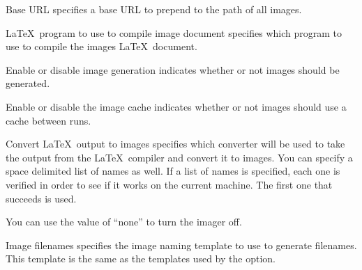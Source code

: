 \begin{configuration}{Base URL}
specifies a base URL to prepend to the path of all images.
\end{configuration}

\begin{configuration}{\LaTeX\ program to use to compile image document}
specifies which program to use to compile the images \LaTeX\ document.
\end{configuration}

\begin{configuration}{Enable or disable image generation}
indicates whether or not images should be generated.
\end{configuration}

\begin{configuration}{Enable or disable the image cache}
indicates whether or not images should use a cache between runs.
\end{configuration}

\begin{configuration}{Convert \LaTeX\ output to images}
specifies which converter will be used to take the output from the
\LaTeX\ compiler and convert it to images.  You can specify a space
delimited list of names as well.  If a list of names is specified,
each one is verified in order to see if it works on the current machine.
The first one that succeeds is used.

You can use the value of ``none'' to turn the imager off.
\end{configuration}

\begin{configuration}{Image filenames}
specifies the image naming template to use to generate filenames.  This
template is the same as the templates used by the 
option.
\end{configuration}

